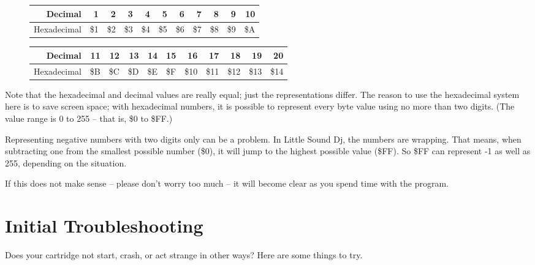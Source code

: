 \begin{figure}[hbtp]
\centering

\begin{tabular}{r|r|r|r|r|r|r|r|r|r|r}
 Decimal & 1 & 2 & 3 & 4 & 5 & 6 & 7 & 8 & 9 & 10 \\
\hline
 Hexadecimal & \$1 & \$2 & \$3 & \$4 & \$5 & \$6 & \$7 & \$8 & \$9 & \$A \\
\end{tabular}

\begin{tabular}{r|r|r|r|r|r|r|r|r|r|r}
 Decimal & 11 & 12 & 13 & 14 & 15 & 16 & 17 & 18 & 19 & 20 \\
\hline
 Hexadecimal & \$B & \$C & \$D & \$E & \$F & \$10 & \$11 & \$12 & \$13 & \$14  \\
\end{tabular}

\end{figure}

Note that the hexadecimal and decimal values are really equal; just the representations differ.
The reason to use the hexadecimal system here is to save screen space; with hexadecimal
numbers, it is possible to represent every byte value using no more than two digits. (The
value range is 0 to 255 -- that is, \$0 to \$FF.)

Representing negative numbers with two digits only can be a problem. In Little Sound Dj,
the numbers are wrapping. That means, when subtracting one from the smallest possible
number (\$0), it will jump to the highest possible value (\$FF). So \$FF can represent -1 as well as 255, depending on the situation.

If this does not make sense -- please don't worry too much -- it will become clear as you spend time with the program.

\section{Initial Troubleshooting}

Does your cartridge not start, crash, or act strange in other ways? Here are some things to try.

